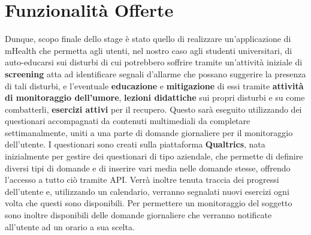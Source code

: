 \section{Funzionalità Offerte}
Dunque, scopo finale dello stage è stato quello di realizzare un'applicazione di mHealth che permetta agli utenti, nel nostro caso agli studenti universitari, di auto-educarsi sui disturbi di cui potrebbero soffrire tramite un'attività iniziale di \textbf{screening} atta ad identificare segnali d'allarme che possano suggerire la presenza di tali disturbi, e l'eventuale \textbf{educazione} e \textbf{mitigazione} di essi tramite \textbf{attività di monitoraggio dell'umore}, \textbf{lezioni didattiche} sui propri disturbi e su come combatterli, \textbf{esercizi attivi} per il recupero.
Questo sarà eseguito utilizzando dei questionari accompagnati da contenuti multimediali da
completare settimanalmente, uniti a una parte di domande giornaliere per il monitoraggio
dell'utente. I questionari sono creati sulla piattaforma \textbf{Qualtrics}, nata inizialmente per gestire dei questionari di tipo aziendale, che permette di definire diversi tipi di domande e di inserire vari media nelle domande stesse, offrendo l'accesso a tutto ciò tramite API.
Verrà inoltre tenuta traccia dei progressi dell'utente e, utilizzando un calendario, verranno segnalati nuovi esercizi ogni volta che questi sono disponibili. Per permettere un monitoraggio del soggetto sono inoltre disponibili delle domande giornaliere che verranno notificate all'utente ad un orario a sua scelta.

